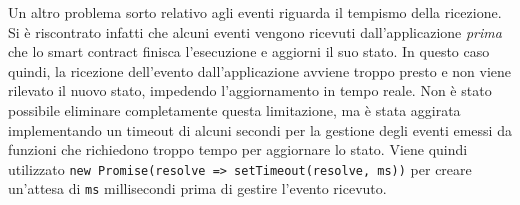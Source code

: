 \documentclass[12pt,a4paper,openright,twoside]{report}
\begin{document}
\label{events_limitation}Un altro problema sorto relativo agli eventi riguarda il tempismo della ricezione. Si è riscontrato infatti che alcuni eventi vengono ricevuti dall'applicazione \textit{prima} che lo smart contract finisca l'esecuzione e aggiorni il suo stato. In questo caso quindi, la ricezione dell'evento dall'applicazione avviene troppo presto e non viene rilevato il nuovo stato, impedendo l'aggiornamento in tempo reale. Non è stato possibile eliminare completamente questa limitazione, ma è stata aggirata implementando un timeout di alcuni secondi per la gestione degli eventi emessi da funzioni che richiedono troppo tempo per aggiornare lo stato. Viene quindi utilizzato \texttt{new Promise(resolve => setTimeout(resolve, ms))} per creare un'attesa di \texttt{ms} millisecondi prima di gestire l'evento ricevuto.
\end{document}
